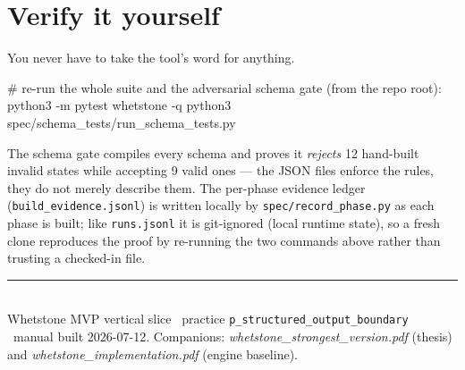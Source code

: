 \documentclass[11pt]{article}
\newcommand{\code}[1]{\textcolor{ink}{\texttt{#1}}}
\begin{document}
\section{Verify it yourself}

You never have to take the tool's word for anything.

\begin{term}
# re-run the whole suite and the adversarial schema gate (from the repo root):
python3 -m pytest whetstone -q
python3 spec/schema_tests/run_schema_tests.py
\end{term}

The schema gate compiles every schema and proves it \emph{rejects} 12 hand-built invalid
states while accepting 9 valid ones --- the JSON files enforce the rules, they do not merely
describe them. The per-phase evidence ledger (\code{build\_evidence.jsonl}) is written
locally by \code{spec/record\_phase.py} as each phase is built; like \code{runs.jsonl} it is
git-ignored (local runtime state), so a fresh clone reproduces the proof by re-running the
two commands above rather than trusting a checked-in file.

\vspace{0.6em}
{\color{rule}\rule{\textwidth}{1pt}}\\[0.3em]
{\footnotesize\color{stone}Whetstone MVP vertical slice \textbullet\ practice
\code{p\_structured\_output\_boundary} \textbullet\ manual built 2026-07-12. Companions:
\emph{whetstone\_strongest\_version.pdf} (thesis) and \emph{whetstone\_implementation.pdf}
(engine baseline).}
\end{document}
